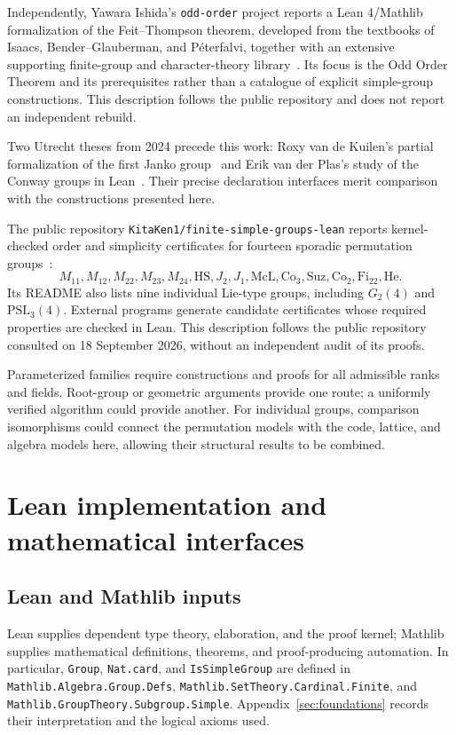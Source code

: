 \documentclass[11pt]{article}
\numberwithin{equation}{section}
\theoremstyle{definition}
\newcommand{\PSL}{\mathrm{PSL}}
\newcommand{\Co}{\mathrm{Co}}
\newcommand{\Fi}{\mathrm{Fi}}
\newcommand{\Suz}{\mathrm{Suz}}
\newcommand{\code}[1]{\texttt{\small #1}}
\newcommand{\leanname}[1]{{\small\nolinkurl{#1}}}
\begin{document}
Independently, Yawara Ishida's \code{odd-order} project reports a
Lean 4/Mathlib formalization of the Feit--Thompson theorem, developed
from the textbooks of Isaacs, Bender--Glauberman, and P\'eterfalvi,
together with an extensive supporting finite-group and character-theory
library~\cite{IshidaOddOrder}. Its focus is the Odd Order Theorem and
its prerequisites rather than a catalogue of explicit simple-group
constructions. This description follows the public repository and does
not report an independent rebuild.

Two Utrecht theses from 2024 precede this work: Roxy van de Kuilen's
partial formalization of the first Janko group~\cite{Kuilen} and Erik
van der Plas's study of the Conway groups in Lean~\cite{Plas}.
Their precise declaration interfaces merit comparison with the
constructions presented here.

The public repository \nolinkurl{KitaKen1/finite-simple-groups-lean}
reports kernel-checked order and simplicity certificates for fourteen
sporadic permutation groups~\cite{KitaKen}:
\[
 M_{11},M_{12},M_{22},M_{23},M_{24},\mathrm{HS},J_2,J_1,
 \mathrm{McL},\Co_3,\Suz,\Co_2,\Fi_{22},\mathrm{He}.
\]
Its README also lists nine individual Lie-type groups, including
$G_2(4)$ and $\PSL_3(4)$. External programs generate candidate
certificates whose required properties are checked in Lean. This
description follows the public repository consulted on 18 September
2026, without an independent audit of its proofs.

Parameterized families require constructions and proofs for all
admissible ranks and fields. Root-group or geometric arguments provide
one route; a uniformly verified algorithm could provide another.
For individual groups, comparison isomorphisms could connect the
permutation models with the code, lattice, and algebra models here,
allowing their structural results to be combined.

\FloatBarrier

\appendix
\section{Lean implementation and mathematical interfaces}\label{sec:libraries}

\subsection{Lean and Mathlib inputs}

Lean supplies dependent type theory, elaboration, and the proof kernel;
Mathlib supplies mathematical definitions, theorems, and proof-producing
automation. In particular, \code{Group}, \code{Nat.card}, and
\code{IsSimpleGroup} are defined in
\leanname{Mathlib.Algebra.Group.Defs},
\leanname{Mathlib.SetTheory.Cardinal.Finite}, and
\leanname{Mathlib.GroupTheory.Subgroup.Simple}.
Appendix~\ref{sec:foundations} records their interpretation and the
logical axioms used.
\end{document}
